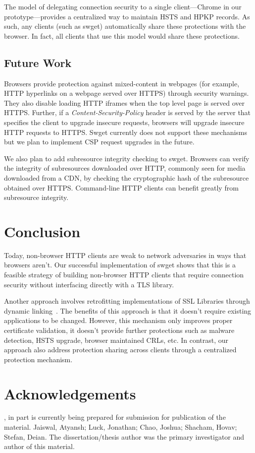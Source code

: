 The model of delegating connection security to a single client---Chrome in our
prototype---provides a centralized way to maintain HSTS and HPKP records. As such,
any clients (such as swget) automatically share these protections with the
browser. In fact, all clients that use this model would share these
protections.

\subsection{Future Work}
Browsers provide protection against mixed-content in webpages (for example,
HTTP hyperlinks on a webpage served over HTTPS) through security warnings. They
also disable loading HTTP iframes when the top level page is served over HTTPS.
Further, if a \emph{Content-Security-Policy} header is served by the server
that specifies the client to upgrade insecure requests, browsers will upgrade
insecure HTTP requests to HTTPS. Swget currently does not support these
mechanisms but we plan to implement CSP request upgrades in the future.

We also plan to add subresource integrity checking to swget. Browsers can
verify the integrity of subresources downloaded over HTTP, commonly seen for
media downloaded from a CDN, by checking the cryptographic hash of the
subresource obtained over HTTPS. Command-line HTTP clients can benefit greatly
from subresource integrity.

\section{Conclusion}
\label{sec:conclusion-saber}

Today, non-browser HTTP clients are weak to network adversaries in ways that
browsers aren't. Our successful implementation of swget shows that this is a
feasible strategy of building non-browser HTTP clients that require connection
security without interfacing directly with a TLS library.

Another approach involves retrofitting implementations of SSL Libraries
through dynamic linking~\cite{certshim}. The benefits of this approach is that
it doesn't require existing applications to be changed. However, this mechanism
only improves proper certificate validation, it doesn't provide further
protections such as malware detection, HSTS upgrade, browser maintained CRLs,
etc. In contrast, our approach also address protection sharing across clients
through a centralized protection mechanism.

\section{Acknowledgements}
\label{sec:acknowledgement-saber}
, in part is currently being prepared for submission for
publication of the material. Jaiswal, Atyansh; Luck, Jonathan; Chao, Joshua;
Shacham, Hovav; Stefan, Deian. The dissertation/thesis author was the primary
investigator and author of this material.
